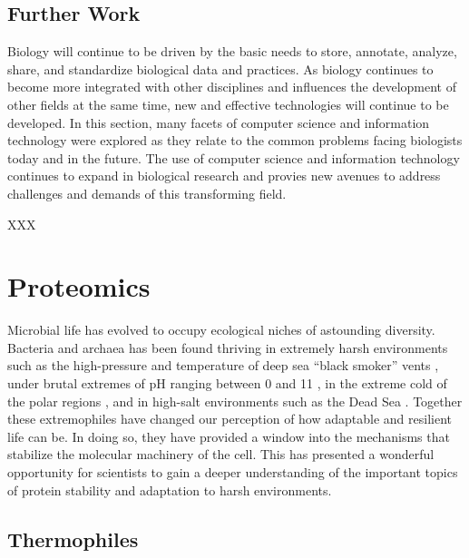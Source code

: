 \subsection{Further Work}

Biology will continue to be driven by the basic needs to store, annotate,
analyze, share, and standardize biological data and practices. As biology
continues to become more integrated with other disciplines and influences the
development of other fields at the same time, new and effective technologies
will continue to be developed. In this section, many facets of computer science
and information technology were explored as they relate to the common problems
facing biologists today and in the future.  The use of computer science and
information technology continues to expand in biological research and provies
new avenues to address challenges and demands of this transforming field.



XXX
\section{Proteomics}

Microbial life has evolved to occupy ecological niches of astounding diversity.
Bacteria and archaea has been found thriving in extremely harsh environments
such as the high-pressure and temperature of deep sea ``black smoker'' vents
\cite{blochl1997pfg}, under brutal extremes of pH ranging between 0 and 11
\cite{2,4}, in the extreme cold of the polar regions \cite{6,7}, and in
high-salt environments such as the Dead Sea \cite{5}.  Together these
extremophiles have changed our perception of how adaptable and resilient life
can be. In doing so, they have provided a window into the mechanisms that
stabilize the molecular machinery of the cell. This has presented a wonderful
opportunity for scientists to gain a deeper understanding of the important
topics of protein stability and adaptation to harsh environments.

\subsection{Thermophiles}

